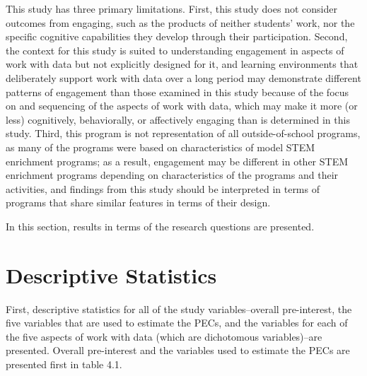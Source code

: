 \documentclass[]{book}
\theoremstyle{definition}
\theoremstyle{definition}
\theoremstyle{definition}
\theoremstyle{remark}
\begin{document}
This study has three primary limitations. First, this study does not
consider outcomes from engaging, such as the products of neither
students' work, nor the specific cognitive capabilities they develop
through their participation. Second, the context for this study is
suited to understanding engagement in aspects of work with data but not
explicitly designed for it, and learning environments that deliberately
support work with data over a long period may demonstrate different
patterns of engagement than those examined in this study because of the
focus on and sequencing of the aspects of work with data, which may make
it more (or less) cognitively, behaviorally, or affectively engaging
than is determined in this study. Third, this program is not
representation of all outside-of-school programs, as many of the
programs were based on characteristics of model STEM enrichment
programs; as a result, engagement may be different in other STEM
enrichment programs depending on characteristics of the programs and
their activities, and findings from this study should be interpreted in
terms of programs that share similar features in terms of their design.

In this section, results in terms of the research questions are
presented.

\section{Descriptive Statistics}\label{descriptive-statistics}

First, descriptive statistics for all of the study variables--overall
pre-interest, the five variables that are used to estimate the PECs, and
the variables for each of the five aspects of work with data (which are
dichotomous variables)--are presented. Overall pre-interest and the
variables used to estimate the PECs are presented first in table 4.1.
\end{document}

